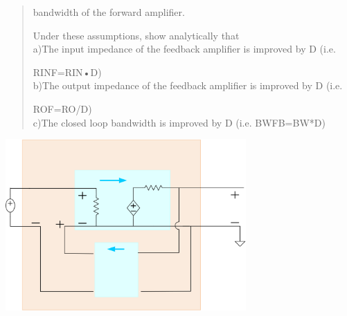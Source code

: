 \documentclass[10pt,a4paper]{article}
\begin{document}
\begin{quote}
bandwidth of the forward amplifier.

Under these assumptions, show analytically that\\
a)The input impedance of the feedback amplifier is improved by D (i.e.

RINF=RIN•D)\\
b)The output impedance of the feedback amplifier is improved by D (i.e.

ROF=RO/D)\\
c)The closed loop bandwidth is improved by D (i.e. BWFB=BW*D)
\end{quote}




\includegraphics[width=3.61111in,height=2.58333in]{vertopal_3376d9a0695b4078a59040ba2f51c60d/media/image1.png}
\end{document}
